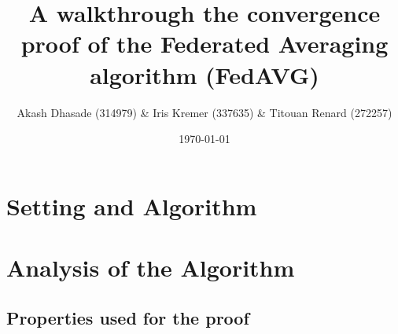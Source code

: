 \documentclass[11pt,hidelinks]{article}
\title{A walkthrough the convergence proof of the Federated Averaging algorithm (FedAVG)}
\date{\today}
\author{Akash Dhasade (314979) \& Iris Kremer (337635) \& Titouan Renard (272257)}
\begin{document}
\maketitle	

\section{Setting and Algorithm}

\newpage

\section{Analysis of the Algorithm}

\newpage
\subsection{Properties used for the proof}

\newpage

% 
\end{document}
